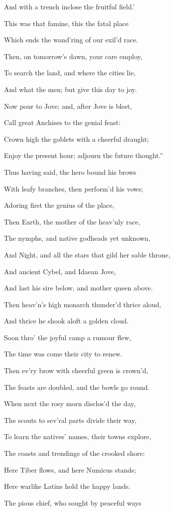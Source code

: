 And with a trench inclose the fruitful field.’

This was that famine, this the fatal place

Which ends the wand’ring of our exil’d race.

Then, on tomorrow’s dawn, your care employ,

To search the land, and where the cities lie,

And what the men; but give this day to joy.

Now pour to Jove; and, after Jove is blest,

Call great Anchises to the genial feast:

Crown high the goblets with a cheerful draught;

Enjoy the present hour; adjourn the future thought.”

Thus having said, the hero bound his brows

With leafy branches, then perform’d his vows;

Adoring first the genius of the place,

Then Earth, the mother of the heav’nly race,

The nymphs, and native godheads yet unknown,

And Night, and all the stars that gild her sable throne,

And ancient Cybel, and Idaean Jove,

And last his sire below, and mother queen above.

Then heav’n’s high monarch thunder’d thrice aloud,

And thrice he shook aloft a golden cloud.

Soon thro’ the joyful camp a rumour flew,

The time was come their city to renew.

Then ev’ry brow with cheerful green is crown’d,

The feasts are doubled, and the bowls go round.

When next the rosy morn disclos’d the day,

The scouts to sev’ral parts divide their way,

To learn the natives’ names, their towns explore,

The coasts and trendings of the crooked shore:

Here Tiber flows, and here Numicus stands;

Here warlike Latins hold the happy lands.

The pious chief, who sought by peaceful ways

